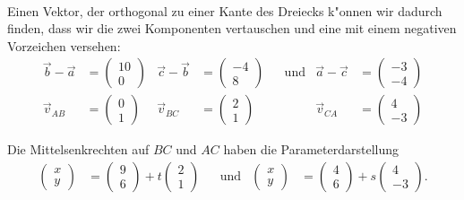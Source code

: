 \begin{loesung}
\begin{teilaufgaben}
\[\begin{aligned}
\end{aligned}
\]
\item Einen Vektor, der orthogonal zu einer Kante des Dreiecks k"onnen
wir dadurch finden, dass wir die zwei Komponenten vertauschen und eine
mit einem negativen Vorzeichen versehen:
\[
\begin{aligned}
\vec{b}-\vec{a}&=\begin{pmatrix}10\\ 0\end{pmatrix}&
\vec{c}-\vec{b}&=\begin{pmatrix}-4\\ 8\end{pmatrix}&
&\text{und}&
\vec{a}-\vec{c}&=\begin{pmatrix}-3\\-4\end{pmatrix}
\\
   \vec{v}_{AB}&=\begin{pmatrix} 0\\ 1\end{pmatrix}&
   \vec{v}_{BC}&=\begin{pmatrix} 2\\ 1\end{pmatrix}&
&&
   \vec{v}_{CA}&=\begin{pmatrix} 4\\-3\end{pmatrix}
\end{aligned}
\]
\item
Die Mittelsenkrechten auf $BC$ und $AC$ haben die Parameterdarstellung
\[
\begin{aligned}
\begin{pmatrix}x\\y\end{pmatrix}
&=
\begin{pmatrix}9\\6\end{pmatrix}+t\begin{pmatrix}2\\ 1\end{pmatrix}
&&\text{und}&
\begin{pmatrix}x\\y\end{pmatrix}
&=
\begin{pmatrix}4\\6\end{pmatrix}+s\begin{pmatrix}4\\-3\end{pmatrix}.

\end{aligned}\]
\end{teilaufgaben}
\end{loesung}
